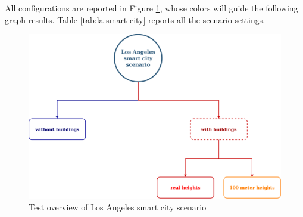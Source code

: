 		
		All configurations are reported in Figure \ref{fig:la-smart-city-overview}, whose colors will guide the following graph results. Table \ref{tab:la-smart-city} reports all the scenario settings.
		
		\begin{figure}[H]
			\centering
			\includegraphics[width=1.0\textwidth]{immagini/la-smart-city/overview}
			\caption{Test overview of Los Angeles smart city scenario}
			\label{fig:la-smart-city-overview}
		\end{figure}
		
